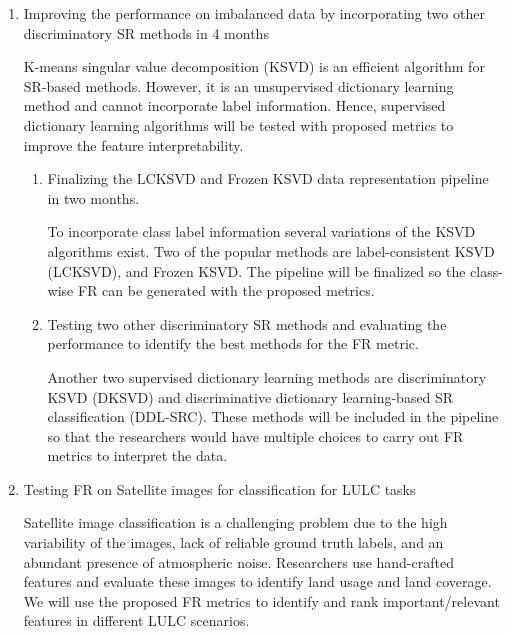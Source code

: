 \begin{enumerate}
\begin{enumerate}
    \end{enumerate}
    
    \item Improving the performance on imbalanced data by incorporating two other discriminatory SR methods in 4 months
    
    K-means singular value decomposition (KSVD)\cite{Aharon2006} is an efficient algorithm for SR-based methods. However, it is an unsupervised dictionary learning method and cannot incorporate label information. Hence, supervised dictionary learning algorithms will be tested with proposed metrics to improve the feature interpretability.
    
    \begin{enumerate}
    
        \item Finalizing the LCKSVD and Frozen KSVD data representation pipeline in two months.
        
        To incorporate class label information several variations of the KSVD algorithms exist. Two of the popular methods are label-consistent KSVD (LCKSVD)\cite{Jiang2011}, and Frozen KSVD\cite{Carroll2017}. The pipeline will be finalized so the class-wise FR can be generated with the proposed metrics. 
        
        \item Testing two other discriminatory SR methods and evaluating the performance to identify the best methods for the FR metric.
        
        Another two supervised dictionary learning methods are discriminatory KSVD (DKSVD)\cite{Zhang2010} and discriminative dictionary learning-based SR classification (DDL-SRC)\cite{Kong2021}. These methods will be included in the pipeline so that the researchers would have multiple choices to carry out FR metrics to interpret the data.
        
    \end{enumerate}
    
    \item Testing FR on Satellite images for classification for LULC tasks
    
    Satellite image classification is a challenging problem due to the high variability of the images, lack of reliable ground truth labels, and an abundant presence of atmospheric noise. Researchers use hand-crafted features and evaluate these images to identify land usage and land coverage. We will use the proposed FR metrics to identify and rank important/relevant features in different LULC scenarios. 
    

\end{enumerate}
